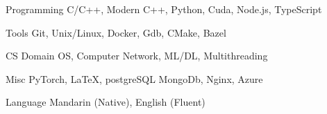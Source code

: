 

\begin{cvskills}

  \cvskill
    {Programming} %
    {C/C++, Modern C++, Python, Cuda, Node.js, TypeScript} %

  \cvskill
    {Tools} %
    {Git, Unix/Linux, Docker, Gdb, CMake, Bazel} %

  \cvskill
    {CS Domain} %
    {OS, Computer Network, ML/DL, Multithreading} %

  \cvskill
    {Misc} %
    {PyTorch, LaTeX, postgreSQL MongoDb, Nginx, Azure} %

  \cvskill
    {Language} %
    {Mandarin (Native), English (Fluent)} %
\end{cvskills}
